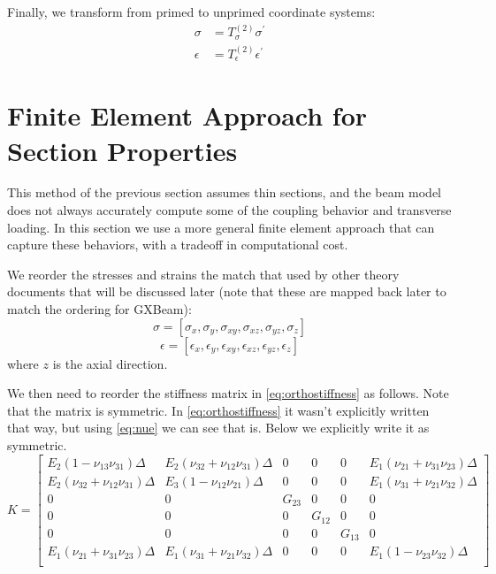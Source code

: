 \documentclass{article}
\begin{document}
Finally, we transform from primed to unprimed coordinate systems:
\begin{align}
\sigma &= T_\sigma^{(2)} \sigma^\prime\\
\epsilon &= T_\epsilon^{(2)} \epsilon^\prime
\end{align}

\section{Finite Element Approach for Section Properties}

This method of the previous section assumes thin sections, and the beam model does not always accurately compute some of the coupling behavior and transverse loading. In this section we use a more general finite element approach that can capture these behaviors, with a tradeoff in computational cost.

We reorder the stresses and strains the match that used by other theory documents that will be discussed later (note that these are mapped back later to match the ordering for GXBeam):
\begin{equation}
\sigma = [\sigma_x, \sigma_y, \sigma_{xy}, \sigma_{xz}, \sigma_{yz}, \sigma_{z}]
\label{eq:sigmareorder}
\end{equation}
\begin{equation}
\epsilon = [\epsilon_x, \epsilon_y, \epsilon_{xy}, \epsilon_{xz}, \epsilon_{yz}, \epsilon_{z}]
\end{equation}
where $z$ is the axial direction.

We then need to reorder the stiffness matrix in \cref{eq:orthostiffness} as follows.  Note that the matrix is symmetric. In \cref{eq:orthostiffness} it wasn't explicitly written that way, but using \cref{eq:nue} we can see that is.  Below we explicitly write it as symmetric.
\begin{equation}
K
=
\left[
\begin{matrix}
E_2(1 - \nu_{13}\nu_{31})\Delta & E_2(\nu_{32} + \nu_{12}\nu_{31})\Delta & 0 & 0 & 0 & E_1(\nu_{21} + \nu_{31}\nu_{23})\Delta \\
E_2(\nu_{32} + \nu_{12}\nu_{31})\Delta & E_3(1 - \nu_{12}\nu_{21})\Delta & 0 & 0 & 0 & E_1(\nu_{31} + \nu_{21}\nu_{32})\Delta \\
0 & 0 & G_{23} & 0 & 0 & 0 \\
0 & 0 & 0 & G_{12} & 0 & 0 \\
0 & 0 & 0 & 0 & G_{13} & 0 \\
E_1(\nu_{21} + \nu_{31}\nu_{23})\Delta & E_1(\nu_{31} + \nu_{21}\nu_{32})\Delta & 0 & 0 & 0 & E_1(1 - \nu_{23}\nu_{32})\Delta \\
\end{matrix}
\right]
\end{equation}
\end{document}
